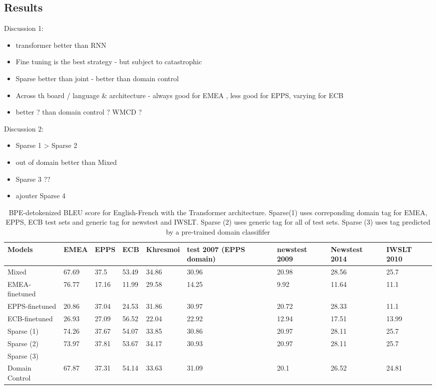 \documentclass[11pt,a4paper]{article}
\begin{document}
\subsection{Results}
Discussion 1:
\begin{itemize}
\item transformer better than RNN
\item Fine tuning is the best strategy - but subject to catastrophic
\item Sparse better than joint - better than domain control
\item Across th board / language \& architecture - always good for EMEA , less good for EPPS, varying for ECB
\item better ? than domain control ? WMCD ?
\end{itemize}

Discussion 2:
\begin{itemize}
\item Sparse 1 > Sparse 2
\item out of domain better than Mixed
\item Sparse 3 ??
\item ajouter Sparse 4
\end{itemize}

\begin{table}
\begin{center}
 \begin{tabularx}{\textwidth}{|| X | X | X | X | X | X | X | X | X ||} 
 \hline
 Models & EMEA & EPPS & ECB & Khresmoi & test 2007 (EPPS domain) & newstest 2009 & Newstest 2014 & IWSLT 2010 \\ [0.5ex] 
 \hline\hline
 Mixed & 67.69 & 37.5 & 53.49 & 34.86 & 30.96 & 20.98 & 28.56 & 25.7 \\
 \hline
 EMEA-finetuned & 76.77 & 17.16 & 11.99 & 29.58 & 14.25 & 9.92 & 11.64 & 11.1 \\
 \hline
 EPPS-finetuned & 20.86 & 37.04 & 24.53 & 31.86 & 30.97 & 20.72 & 28.33 & 11.1 \\
 \hline
 ECB-finetuned & 26.93 & 27.09 & 56.52 & 22.04 & 22.92 & 12.94 & 17.51 & 13.99 \\
 \hline
 Sparse (1) & 74.26 & 37.67 & 54.07 & 33.85 & 30.86 & 20.97 & 28.11 & 25.7 \\
 \hline
 Sparse (2) & 73.97 & 37.81 & 53.67 & 34.17 & 30.93 & 20.97 & 28.11 & 25.7 \\
 \hline
 Sparse (3) &  &  &  &  &  &  &  & \\
 \hline
 Domain Control & 67.87 & 37.31 & 54.14 & 33.63 & 31.09 &  20.1 & 26.52 & 24.81\\
 \hline
\end{tabularx}
\end{center}

\caption{BPE-detokenized BLEU score for English-French with the Transformer architecture. Sparse(1) uses correponding domain tag for EMEA, EPPS, ECB test sets and generic tag for newstest and IWSLT. Sparse (2) uses generic tag for all of test sets. Sparse (3) uses tag predicted by a pre-trained domain classififer}
\label{tab:1}
\end{table}
\end{document}
